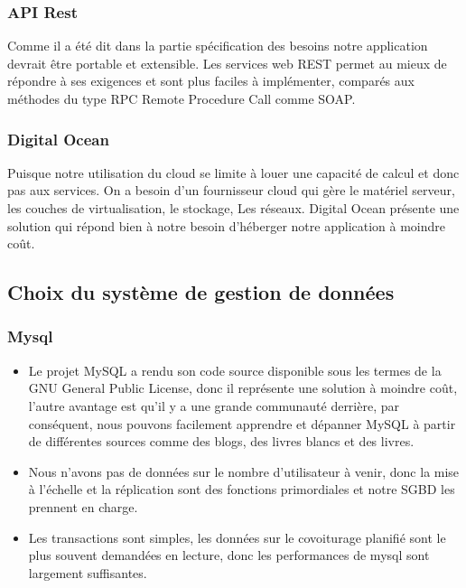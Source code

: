 \subsubsection{API Rest} %
\label{ssub:api_rest}
Comme il a été dit dans la partie spécification des besoins notre application devrait être portable et extensible. Les services web REST permet au mieux de répondre à ses exigences et sont plus faciles à implémenter, comparés aux méthodes du type RPC Remote Procedure Call comme SOAP.
\subsubsection{Digital Ocean} %
\label{ssub:digital_ocean}
Puisque notre utilisation du cloud se limite à louer une capacité de calcul et donc pas aux services. On a besoin d'un fournisseur cloud qui gère le matériel serveur, les couches de virtualisation, le stockage, Les réseaux.\newline
Digital Ocean présente une solution qui répond bien à notre besoin d'héberger notre application à moindre coût.\cite{digitalocean}

\subsection{Choix du système de gestion de données} %
\label{sub:partie_base_de_données}
\subsubsection{Mysql} %
\label{ssub:le_choix_de_mysql}
\begin{itemize}
	\item Le projet MySQL a rendu son code source disponible sous les termes de la GNU General Public License, donc il représente une solution à moindre coût, l'autre avantage est qu'il y a une grande communauté derrière, par conséquent, nous pouvons facilement apprendre et dépanner MySQL à partir de différentes sources comme des blogs, des livres blancs et des livres.
	\item Nous n'avons pas de données sur le nombre d'utilisateur à venir, donc la mise à l'échelle et la réplication sont des fonctions primordiales et notre SGBD les prennent  en charge.
	\item Les transactions sont simples, les données sur le covoiturage planifié sont le plus souvent demandées en lecture, donc les performances de mysql sont largement suffisantes.
\end{itemize}

